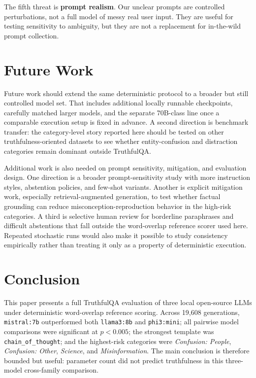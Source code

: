 \documentclass[conference]{IEEEtran}
\begin{document}
The fifth threat is \textbf{prompt realism}. Our unclear prompts are controlled perturbations, not a full model of messy real user input. They are useful for testing sensitivity to ambiguity, but they are not a replacement for in-the-wild prompt collection.

\section{\textbf{Future Work}}

Future work should extend the same deterministic protocol to a broader but still controlled model set. That includes additional locally runnable checkpoints, carefully matched larger models, and the separate 70B-class line once a comparable execution setup is fixed in advance. A second direction is benchmark transfer: the category-level story reported here should be tested on other truthfulness-oriented datasets to see whether entity-confusion and distraction categories remain dominant outside TruthfulQA.

Additional work is also needed on prompt sensitivity, mitigation, and evaluation design. One direction is a broader prompt-sensitivity study with more instruction styles, abstention policies, and few-shot variants. Another is explicit mitigation work, especially retrieval-augmented generation, to test whether factual grounding can reduce misconception-reproduction behavior in the high-risk categories. A third is selective human review for borderline paraphrases and difficult abstentions that fall outside the word-overlap reference scorer used here. Repeated stochastic runs would also make it possible to study consistency empirically rather than treating it only as a property of deterministic execution.

\section{\textbf{Conclusion}}

This paper presents a full TruthfulQA evaluation of three local open-source LLMs under deterministic word-overlap reference scoring. Across 19,608 generations, \texttt{mistral:7b} outperformed both \texttt{llama3:8b} and \texttt{phi3:mini}; all pairwise model comparisons were significant at $p < 0.005$; the strongest template was \texttt{chain\_of\_thought}; and the highest-risk categories were \textit{Confusion: People}, \textit{Confusion: Other}, \textit{Science}, and \textit{Misinformation}. The main conclusion is therefore bounded but useful: parameter count did not predict truthfulness in this three-model cross-family comparison.
\end{document}

